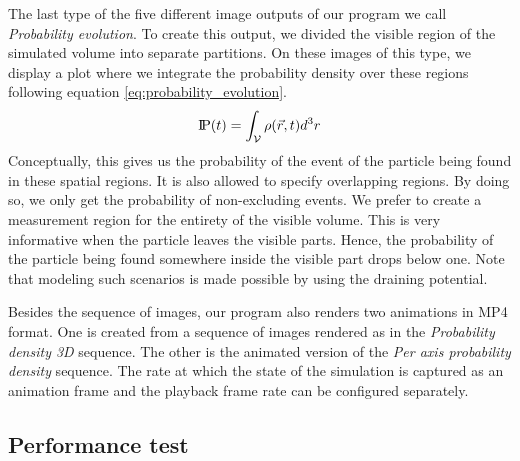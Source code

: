The last type of the five different image outputs of our program we call \textit{Probability evolution}.
To create this output, we divided the visible region of the simulated volume into separate partitions.
On these images of this type, we display a plot where we integrate the probability density over these regions following equation \ref{eq:probability_evolution}.
\begin{equation}
	\text{I\kern-0.15em P}(t)=\int_\mathcal{V}\rho(\vec{r},t)d^3r
	\label{eq:probability_evolution}
\end{equation}
Conceptually, this gives us the probability of the event of the particle being found in these spatial regions.
It is also allowed to specify overlapping regions.
By doing so, we only get the probability of non-excluding events.
We prefer to create a measurement region for the entirety of the visible volume.
This is very informative when the particle leaves the visible parts. Hence, the probability of the particle being found somewhere inside the visible part drops below one.
Note that modeling such scenarios is made possible by using the draining potential.

Besides the sequence of images, our program also renders two animations in MP4 format.
One is created from a sequence of images rendered as in the \textit{Probability density 3D} sequence.
The other is the animated version of the \textit{Per axis probability density} sequence.
The rate at which the state of the simulation is captured as an animation frame and the playback frame rate can be configured separately.

\subsection{Performance test}

